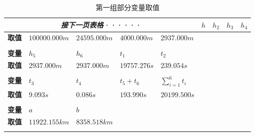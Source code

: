 \begin{longtable}{|c|*{4}{>{\centering\arraybackslash}X|}}
    \endhead
    \endfirsthead
    \multicolumn{5}{c}{\itshape 接下一页表格······}
    \endfoot
    \endlastfoot
    \hline
    \textbf{变量} & $h$           & $h_2$        & $h_3$         & $h_4$               \\
    \hline
    \textbf{取值} & $100000.000m$ & $24595.000m$ & $4000.000m$   & $2937.000m$         \\
    \hline
    \multicolumn{5}{c}{}                                                               \\[-7pt]
    \hline
    \textbf{变量} & $h_5$         & $h_6$        & $t_1$         & $t_2$               \\
    \hline
    \textbf{取值} & $2937.000m$   & $2937.000m$  & $19757.276s$  & $239.054s$          \\
    \hline
    \multicolumn{5}{c}{}                                                               \\[-7pt]
    \hline
    \textbf{变量} & $t_3$         & $t_4$        & $t_5 + t_6$   & $\sum_{i=1}^{6}t_i$ \\
    \hline
    \textbf{取值} & $9.093s$      & $0.086s$     & $193.990s$    & $20199.500s$        \\
    \hline
    \multicolumn{5}{c}{}                                                               \\[-7pt]
    \cline{1-4}
    \textbf{变量} & $a$         & $b$        & \multicolumn{1}{c|}{$c$}               \\
    \cline{1-4}
    \textbf{取值} & $11922.155km$   & $8358.518km$ & \multicolumn{1}{c|}{$8501.350km$}  \\
    \cline{1-4}
    \caption{第一组部分变量取值}
    \label{tab:1}
\end{longtable}